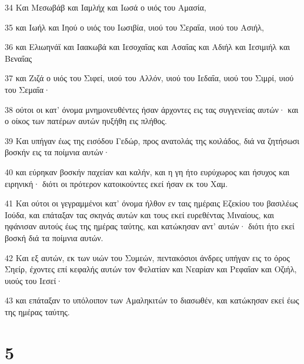 \par 34 Και Μεσωβάβ και Ιαμλήχ και Ιωσά ο υιός του Αμασία,
\par 35 και Ιωήλ και Ιηού ο υιός του Ιωσιβία, υιού του Σεραΐα, υιού του Ασιήλ,
\par 36 και Ελιωηνάϊ και Ιαακωβά και Ιεσοχαΐας και Ασαΐας και Αδιήλ και Ιεσιμιήλ και Βεναΐας
\par 37 και Ζιζά ο υιός του Σιφεί, υιού του Αλλόν, υιού του Ιεδαΐα, υιού του Σιμρί, υιού του Σεμαΐα·
\par 38 ούτοι οι κατ' όνομα μνημονευθέντες ήσαν άρχοντες εις τας συγγενείας αυτών· και ο οίκος των πατέρων αυτών ηυξήθη εις πλήθος.
\par 39 Και υπήγαν έως της εισόδου Γεδώρ, προς ανατολάς της κοιλάδος, διά να ζητήσωσι βοσκήν εις τα ποίμνια αυτών·
\par 40 και εύρηκαν βοσκήν παχείαν και καλήν, και η γη ήτο ευρύχωρος και ήσυχος και ειρηνική· διότι οι πρότερον κατοικούντες εκεί ήσαν εκ του Χαμ.
\par 41 Και ούτοι οι γεγραμμένοι κατ' όνομα ήλθον εν ταις ημέραις Εζεκίου του βασιλέως Ιούδα, και επάταξαν τας σκηνάς αυτών και τους εκεί ευρεθέντας Μιναίους, και ηφάνισαν αυτούς έως της ημέρας ταύτης, και κατώκησαν αντ' αυτών· διότι ήτο εκεί βοσκή διά τα ποίμνια αυτών.
\par 42 Και εξ αυτών, εκ των υιών του Συμεών, πεντακόσιοι άνδρες υπήγαν εις το όρος Σηείρ, έχοντες επί κεφαλής αυτών τον Φελατίαν και Νεαρίαν και Ρεφαΐαν και Οζιήλ, υιούς του Ιεσεί·
\par 43 και επάταξαν το υπόλοιπον των Αμαληκιτών το διασωθέν, και κατώκησαν εκεί έως της ημέρας ταύτης.

\chapter{5}


